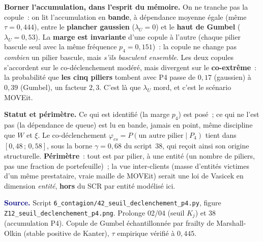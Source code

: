 \documentclass[11pt,a4paper]{article}
\begin{document}
\begin{cle}
\textbf{Borner l'accumulation, dans l'esprit du mémoire.} On ne tranche pas la copule~: on lit
l'accumulation en \textbf{bande}, à dépendance moyenne égale (même $\tau=0{,}444$), entre le
\textbf{plancher gaussien} ($\lambda_U=0$) et le \textbf{haut de Gumbel} ($\lambda_U=0{,}53$).
La \textbf{marge est invariante} d'une copule à l'autre (chaque pilier bascule seul avec la même
fréquence $p_4=0{,}151$)~: la copule ne change pas \emph{combien} un pilier bascule, mais
\emph{s'ils basculent ensemble}. Les deux copules s'accordent sur le co-déclenchement modéré,
mais divergent sur le \textbf{co-extrême}~: la probabilité que \textbf{les cinq piliers}
tombent avec P4 passe de $0{,}17$ (gaussien) à $0{,}39$ (Gumbel), un facteur $2{,}3$. C'est là
que $\lambda_U$ mord, et c'est le scénario MOVEit.
\end{cle}

\begin{cle}[colback=orange!8,colframe=orange!70!black]
\textbf{Statut et périmètre.} Ce qui est identifié (la marge $p_4$) est posé~; ce qui ne l'est
pas (la dépendance de queue) est lu en bande, jamais en point, même discipline que $W$ et
$\xi$. Le co-déclenchement $\varphi_{cs}=P(\text{un autre pilier}\mid P_4)$ tient dans
$[0{,}48\,;\,0{,}58]$, sous la borne $\gamma=0{,}68$ du script~38, qui reçoit ainsi son origine
structurelle. \textbf{Périmètre}~: tout est par pilier, à une entité (un nombre de piliers, pas
une fraction de portefeuille)~; la vue inter-clients (masse d'entités victimes d'un même
prestataire, vraie maille de MOVEit) serait une loi de Vasicek en dimension \emph{entité},
\textbf{hors} du SCR par entité modélisé ici.
\end{cle}

\smallskip
\noindent\footnotesize\textcolor{navy}{\textbf{Source.}} Script
\texttt{6\_contagion/42\_seuil\_declenchement\_p4.py}, figure
\texttt{Z12\_seuil\_declenchement\_p4.png}. Prolonge 02/04 (seuil $K_j$) et 38 (accumulation P4).
Copule de Gumbel échantillonnée par frailty de Marshall-Olkin (stable positive de Kanter),
$\tau$ empirique vérifié à $0{,}445$.
\end{document}
